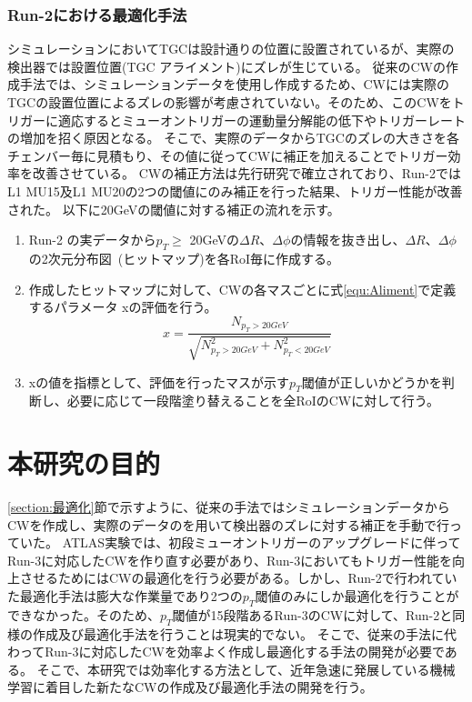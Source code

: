 \subsubsection{Run-2における最適化手法}
シミュレーションにおいてTGCは設計通りの位置に設置されているが、実際の検出器では設置位置(TGC アライメント)にズレが生じている。
従来のCWの作成手法では、シミュレーションデータを使用し作成するため、CWには実際のTGCの設置位置によるズレの影響が考慮されていない。そのため、このCWをトリガーに適応するとミューオントリガーの運動量分解能の低下やトリガーレートの増加を招く原因となる。
そこで、実際のデータからTGCのズレの大きさを各チェンバー毎に見積もり、その値に従ってCWに補正を加えることでトリガー効率を改善させている。
CWの補正方法は先行研究で確立されており、Run-2ではL1 MU15及L1 MU20の2つの閾値にのみ補正を行った結果、トリガー性能が改善された\cite{article:kido-mron}。
以下に20GeVの閾値に対する補正の流れを示す。
\begin{enumerate}\label{table:CW_optimazation}
   \item Run-2 の実データから$p_T \geq$ 20GeVの$\Delta R$、$\Delta \phi$の情報を抜き出し、$\Delta R$、$\Delta \phi$の2次元分布図~(ヒットマップ)を各RoI毎に作成する。
   \item 作成したヒットマップに対して、CWの各マスごとに式\eqref{equ:Aliment}で定義するパラメータ xの評価を行う。
   \begin{equation}
        x = \frac{N_{p_{T}>20GeV}}{\sqrt{N^2_{p_{T}>20GeV}+N^2_{p_{T}<20GeV}}}
　      \label{equ:Aliment}
   \end{equation}
   \item xの値を指標として、評価を行ったマスが示す$p_T$閾値が正しいかどうかを判断し、必要に応じて一段階塗り替えることを全RoIのCWに対して行う。
\end{enumerate}

\section{本研究の目的}
\ref{section:最適化}節で示すように、従来の手法ではシミュレーションデータからCWを作成し、実際のデータのを用いて検出器のズレに対する補正を手動で行っていた。
ATLAS実験では、初段ミューオントリガーのアップグレードに伴ってRun-3に対応したCWを作り直す必要があり、Run-3においてもトリガー性能を向上させるためにはCWの最適化を行う必要がある。しかし、Run-2で行われていた最適化手法は膨大な作業量であり2つの$p_T$閾値のみにしか最適化を行うことができなかった。そのため、$p_T$閾値が15段階あるRun-3のCWに対して、Run-2と同様の作成及び最適化手法を行うことは現実的でない。
そこで、従来の手法に代わってRun-3に対応したCWを効率よく作成し最適化する手法の開発が必要である。
そこで、本研究では効率化する方法として、近年急速に発展している機械学習に着目した新たなCWの作成及び最適化手法の開発を行う。














